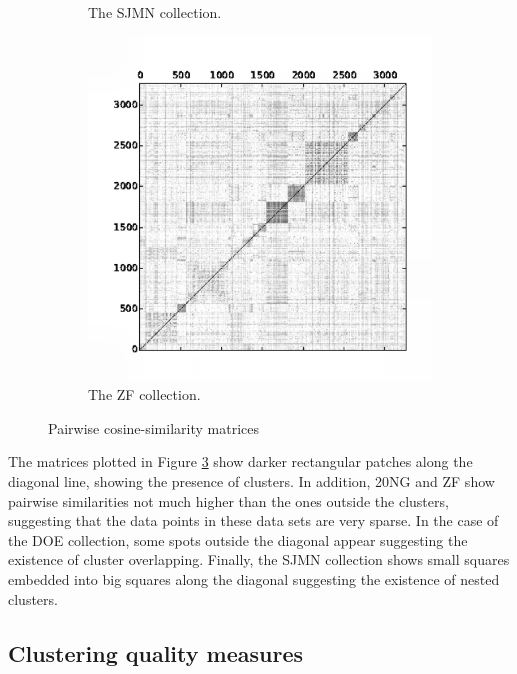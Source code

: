 \documentclass[preprint,12pt,authoryear,review]{elsarticle}
\begin{document}
\begin{figure}[!htbp]
\begin{subfigure}[b]{0.33\textwidth}
        \caption{The SJMN collection.}
        \label{fig:sjmn_sim}
    \end{subfigure}
    \begin{subfigure}[b]{0.33\textwidth}
        \includegraphics[width=\textwidth]{ZF-simcos}
        \caption{The ZF collection.}
        \label{fig:zf_sim}
    \end{subfigure}    
    \caption{Pairwise cosine-similarity matrices}\label{fig:sim_matrices}
\end{figure}

The matrices plotted in Figure \ref{fig:sim_matrices} show darker rectangular patches along the diagonal line, showing the presence of clusters. 
In addition, 20NG and ZF show pairwise similarities not much higher than the ones outside the clusters, suggesting that the data points in these data sets are very sparse. 
In the case of the DOE collection, some spots outside the diagonal appear suggesting the existence of cluster overlapping.
Finally, the SJMN collection shows small squares embedded into big squares along the diagonal suggesting the existence of nested clusters.

\subsection*{Clustering quality measures}
\end{document}
